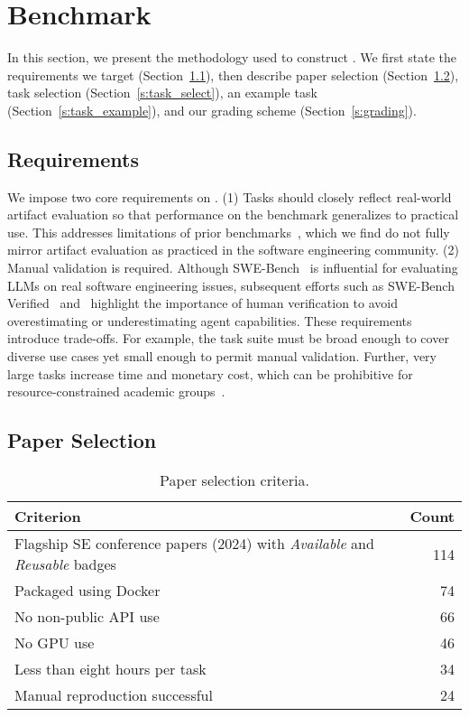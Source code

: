 \section{Benchmark}
\label{s:benchmark}

In this section, we present the methodology used to construct \benchmark.
We first state the requirements we target (Section~\ref{s:requirements}), then describe paper selection (Section~\ref{s:paper_select}), task selection (Section~\ref{s:task_select}), an example task (Section~\ref{s:task_example}), and our grading scheme (Section~\ref{s:grading}).

\subsection{Requirements}
\label{s:requirements}

We impose two core requirements on \benchmark.
(1) Tasks should closely reflect real-world artifact evaluation so that performance on the benchmark generalizes to practical use.
This addresses limitations of prior benchmarks~\cite{DBLP:conf/emnlp/BoginYG0BCSK24,DBLP:journals/tmlr/SiegelKNSN24,DBLP:conf/acl/HuZLWPK25}, which we find do not fully mirror artifact evaluation as practiced in the software engineering community.
(2) Manual validation is required.
Although SWE-Bench~\cite{jimenez2024swebench} is influential for evaluating LLMs on real software engineering issues, subsequent efforts such as SWE-Bench Verified~\cite{chowdhury2024swebenchverified} and~\cite{DBLP:journals/corr/abs-2503-15223} highlight the importance of human verification to avoid overestimating or underestimating agent capabilities.
These requirements introduce trade-offs.
For example, the task suite must be broad enough to cover diverse use cases yet small enough to permit manual validation.
Further, very large tasks increase time and monetary cost, which can be prohibitive for resource-constrained academic groups~\cite{DBLP:conf/iclr/ChanCJASMSLMPMW25}.

\subsection{Paper Selection}
\label{s:paper_select}

\begin{table}[t]
  \caption{Paper selection criteria.}
  \label{t:paper_select}
  \centering
  \begin{tabular}{@{}l r@{}}
    \toprule
    Criterion & Count \\
    \midrule
    Flagship SE conference papers (2024) with \emph{Available} and \emph{Reusable} badges & 114 \\
    Packaged using Docker & 74 \\
    No non-public API use & 66 \\
    No GPU use & 46 \\
    Less than eight hours per task & 34 \\
    Manual reproduction successful & 24 \\
    \bottomrule
  \end{tabular}
\end{table}


